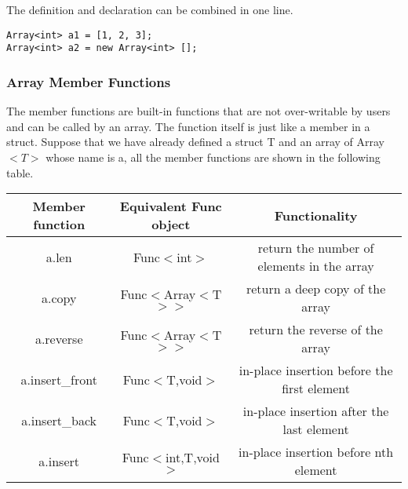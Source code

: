 The definition and declaration can be combined in one line.
\begin{lstlisting}[caption={array\_definition\_oneline.csm}, captionpos=b]
Array<int> a1 = [1, 2, 3];
Array<int> a2 = new Array<int> [];

\end{lstlisting}

\subsubsection{Array Member Functions}
The member functions are built-in functions that are not over-writable by users and can be called by an array. The function itself is just like a member in a struct. Suppose that we have already defined a struct T and an array of Array$<T>$ whose name is a, all the member functions are shown in the following table.
\begin{table}[h]
    \centering
    \setlength{\arrayrulewidth}{0.3mm}
    \renewcommand{\arraystretch}{1.2}
    \begin{tabular}{ccc}
        \toprule
        Member function & Equivalent Func object & Functionality \\
        \midrule
        a.len & Func$<$int$>$ & return the number of elements in the array \\
        \arrayrulecolor{gray!50}\cmidrule(lr){1-3}\arrayrulecolor{black}
        a.copy & Func$<$Array$<$T$>$$>$ & return a deep copy of the array \\
        \arrayrulecolor{gray!50}\cmidrule(lr){1-3}\arrayrulecolor{black}
        a.reverse & Func$<$Array$<$T$>$$>$ & return the reverse of the array \\
        \arrayrulecolor{gray!50}\cmidrule(lr){1-3}\arrayrulecolor{black}
        a.insert\_front & Func$<$T,void$>$ & in-place insertion before the first element \\
        \arrayrulecolor{gray!50}\cmidrule(lr){1-3}\arrayrulecolor{black}
        a.insert\_back  & Func$<$T,void$>$ & in-place insertion after the last element \\
        \arrayrulecolor{gray!50}\cmidrule(lr){1-3}\arrayrulecolor{black}
        a.insert & Func$<$int,T,void$>$ & in-place insertion before nth element \\
        \bottomrule
    \end{tabular}
\end{table}  \\

